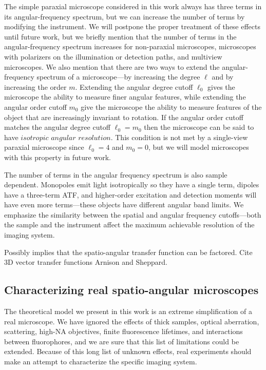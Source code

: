 \documentclass{osa-article}
\begin{document}
The simple paraxial microscope considered in this work always has three terms in
its angular-frequency spectrum, but we can increase the number of terms by
modifying the instrument. We will postpone the proper treatment of these effects
until future work, but we briefly mention that the number of terms in the
angular-frequency spectrum increases for non-paraxial microscopes, microscopes
with polarizers on the illumination or detection paths, and multiview
microscopes. We also mention that there are two ways to extend the
angular-frequency spectrum of a microscope---by increasing the degree $\ell$ and
by increasing the order $m$. Extending the angular degree cutoff $\ell_0$ gives
the microscope the ability to measure finer angular features, while extending
the angular order cutoff $m_0$ give the microscope the ability to measure
features of the object that are increasingly invariant to rotation. If the
angular order cutoff matches the angular degree cutoff $\ell_0 = m_0$ then the
microscope can be said to have $\textit{isotropic angular resolution}$. This
condition is not met by a single-view paraxial microscope since $\ell_0 = 4$ and
$m_0 = 0$, but we will model microscopes with this property in future work. 

The number of terms in the angular frequency spectrum is also sample dependent.
Monopoles emit light isotropically so they have a single term, dipoles have a
three-term ATF, and higher-order excitation and detection moments will have even
more terms---these objects have different angular band limits. We emphasize the
similarity between the spatial and angular frequency cutoffs---both the sample
and the instrument affect the maximum achievable resolution of the imaging
system.

Possibly implies that the spatio-angular transfer function can be factored. Cite
3D vector transfer functions Arnison and Sheppard.  

\subsection{Characterizing real spatio-angular microscopes}
The theoretical model we present in this work is an extreme simplification of a
real microscope. We have ignored the effects of thick samples, optical
aberration, scattering, high-NA objectives, finite fluorescence lifetimes, and
interactions between fluorophores, and we are sure that this list of limitations
could be extended. Because of this long list of unknown effects, real
experiments should make an attempt to characterize the specific imaging system.
\end{document}

